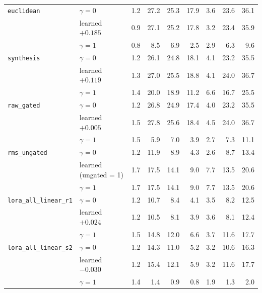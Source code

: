 \begin{tabular}{@{}llrrrrrrr@{}}
\texttt{euclidean} & $\gamma{=}0$ & 1.2 & 27.2 & 25.3 & 17.9 & 3.6 & 23.6 & 36.1 \\
 & learned $+0.185$ & 0.9 & 27.1 & 25.2 & 17.8 & 3.2 & 23.4 & 35.9 \\
 & $\gamma{=}1$ & 0.8 & 8.5 & 6.9 & 2.5 & 2.9 & 6.3 & 9.6 \\
\texttt{synthesis} & $\gamma{=}0$ & 1.2 & 26.1 & 24.8 & 18.1 & 4.1 & 23.2 & 35.5 \\
 & learned $+0.119$ & 1.3 & 27.0 & 25.5 & 18.8 & 4.1 & 24.0 & 36.7 \\
 & $\gamma{=}1$ & 1.4 & 20.0 & 18.9 & 11.2 & 6.6 & 16.7 & 25.5 \\
\texttt{raw\_gated} & $\gamma{=}0$ & 1.2 & 26.8 & 24.9 & 17.4 & 4.0 & 23.2 & 35.5 \\
 & learned $+0.005$ & 1.5 & 27.8 & 25.6 & 18.4 & 4.5 & 24.0 & 36.7 \\
 & $\gamma{=}1$ & 1.5 & 5.9 & 7.0 & 3.9 & 2.7 & 7.3 & 11.1 \\
\texttt{rms\_ungated} & $\gamma{=}0$ & 1.2 & 11.9 & 8.9 & 4.3 & 2.6 & 8.7 & 13.4 \\
 & learned (ungated = 1) & 1.7 & 17.5 & 14.1 & 9.0 & 7.7 & 13.5 & 20.6 \\
 & $\gamma{=}1$ & 1.7 & 17.5 & 14.1 & 9.0 & 7.7 & 13.5 & 20.6 \\
\texttt{lora\_all\_linear\_r1} & $\gamma{=}0$ & 1.2 & 10.7 & 8.4 & 4.1 & 3.5 & 8.2 & 12.5 \\
 & learned $+0.024$ & 1.2 & 10.5 & 8.1 & 3.9 & 3.6 & 8.1 & 12.4 \\
 & $\gamma{=}1$ & 1.5 & 14.8 & 12.0 & 6.6 & 3.7 & 11.6 & 17.7 \\
\texttt{lora\_all\_linear\_s2} & $\gamma{=}0$ & 1.2 & 14.3 & 11.0 & 5.2 & 3.2 & 10.6 & 16.3 \\
 & learned $-0.030$ & 1.2 & 15.4 & 12.1 & 5.9 & 3.2 & 11.6 & 17.7 \\
 & $\gamma{=}1$ & 1.4 & 1.4 & 0.9 & 0.8 & 1.9 & 1.3 & 2.0 \\
\bottomrule
\end{tabular}
